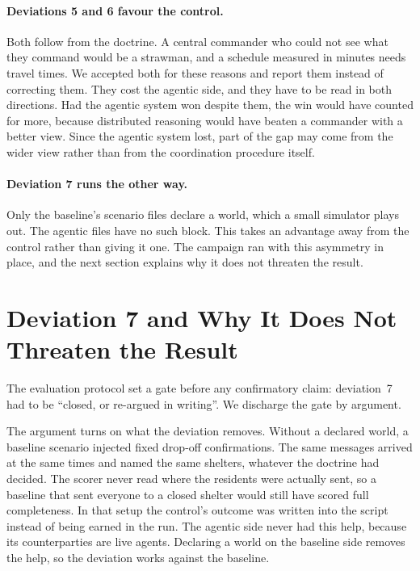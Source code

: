 \paragraph{Deviations 5 and 6 favour the control.} Both follow from the
doctrine. A central commander who could not see what they command would be a
strawman, and a schedule measured in minutes needs travel times. We accepted
both for these reasons and report them instead of correcting them. They cost
the agentic side, and they have to be read in both directions. Had the agentic
system won despite them, the win would have counted for more, because
distributed reasoning would have beaten a commander with a better view. Since
the agentic system lost, part of the gap may come from the wider view rather
than from the coordination procedure itself.

\paragraph{Deviation 7 runs the other way.} Only the baseline's scenario files
declare a world, which a small simulator plays out. The agentic files have no
such block. This takes an advantage away from the control rather than giving it
one. The campaign ran with this asymmetry in place, and the next section
explains why it does not threaten the result.

\section{Deviation 7 and Why It Does Not Threaten the Result}
\label{sec:val:dev7}

The evaluation protocol set a gate before any confirmatory claim: deviation~7
had to be ``closed, or re-argued in writing''. We discharge the gate by
argument.

The argument turns on what the deviation removes. Without a declared world, a
baseline scenario injected fixed drop-off confirmations. The same messages
arrived at the same times and named the same shelters, whatever the doctrine
had decided. The scorer never read where the residents were actually sent, so
a baseline that sent everyone to a closed shelter would still have scored full
completeness. In that setup the control's outcome was written into the script
instead of being earned in the run. The agentic side never had this help,
because its counterparties are live agents. Declaring a world on the baseline
side removes the help, so the deviation works against the baseline.

